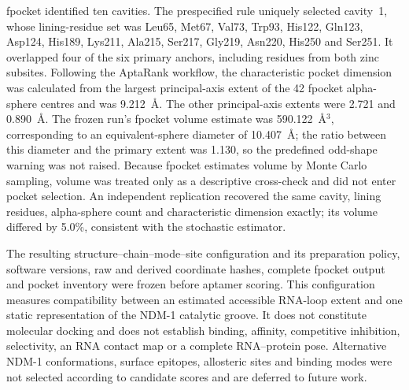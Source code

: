 fpocket identified ten cavities. The prespecified rule uniquely selected
cavity~1, whose lining-residue set was Leu65, Met67, Val73, Trp93, His122,
Gln123, Asp124, His189, Lys211, Ala215, Ser217, Gly219, Asn220, His250 and
Ser251. It overlapped four of the six primary anchors, including residues from
both zinc subsites. Following the AptaRank workflow, the characteristic pocket
dimension was calculated from the largest principal-axis extent of the 42
fpocket alpha-sphere centres and was 9.212~\AA{}. The other principal-axis
extents were 2.721 and 0.890~\AA{}. The frozen run's fpocket volume estimate was
590.122~\AA$^3$, corresponding to an equivalent-sphere diameter of
10.407~\AA{}; the ratio between this diameter and the primary extent was 1.130,
so the predefined odd-shape warning was not raised. Because fpocket estimates
volume by Monte Carlo sampling, volume was treated only as a descriptive
cross-check and did not enter pocket selection. An independent replication
recovered the same cavity, lining residues, alpha-sphere count and
characteristic dimension exactly; its volume differed by 5.0\%, consistent
with the stochastic estimator.

The resulting structure--chain--mode--site configuration and its preparation
policy, software versions, raw and derived coordinate hashes, complete fpocket
output and pocket inventory were frozen before aptamer scoring. This
configuration measures compatibility between an estimated accessible RNA-loop
extent and one static representation of the NDM-1 catalytic groove. It does
not constitute molecular docking and does not establish binding, affinity,
competitive inhibition, selectivity, an RNA contact map or a complete
RNA--protein pose. Alternative NDM-1 conformations, surface epitopes,
allosteric sites and binding modes were not selected according to candidate
scores and are deferred to future work.
